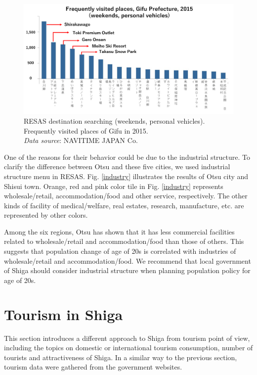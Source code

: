 \documentclass[10pt, conference, compsocconf]{IEEEtran}
\begin{document}
\begin{figure}[!t]
\centering
\begin{center}
   \includegraphics[width= 13cm]{fig/fig3_1}
\caption{RESAS destination searching (weekends, personal vehicles). Frequently visited places of Gifu in 2015.
\\{\it Data source}: NAVITIME JAPAN Co.
}\label{gifu1}
\end{center}
\end{figure}

One of the reasons for their behavior could be due to the industrial structure. 
To clarify the difference between Otsu and these five cities, we used industrial structure menu in RESAS.
Fig. \ref{industry} illustrates the results of Otsu city and Shisui town.
Orange, red and pink color tile in Fig. \ref{industry} represents wholesale/retail, accommodation/food and other service, respectively. The other kinds of facility of medical/welfare, real estates, research, manufacture, etc. are represented by other colors.

Among the six regions, Otsu has shown that it has less commercial facilities related to wholesale/retail and accommodation/food than those of others. This suggests that population change of age of 20s is correlated with industries of wholesale/retail and accommodation/food. We recommend that local government of Shiga should consider industrial structure when planning population policy for age of 20s.

\section{Tourism in Shiga}\label{sec:tour}
This section introduces a different approach to Shiga from tourism point of view, including the topics on domestic or international tourism consumption, number of tourists and attractiveness of Shiga. 
In a similar way to the previous section, tourism data were gathered from the government websites. 
\end{document}
